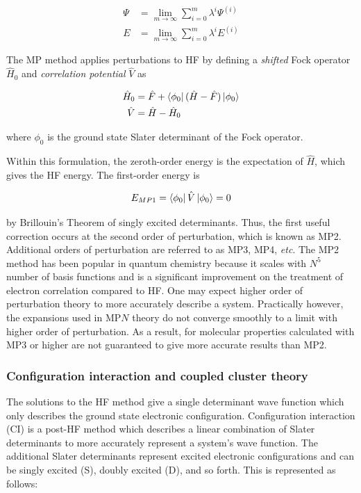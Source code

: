 \begin{align}
 \Psi &= \lim_{m\to\infty} \sum_{i=0}^{m} \lambda^i \Psi^{(i)} \\
  E &= \lim_{m\to\infty} \sum_{i=0}^{m} \lambda^i E^{(i)}
\end{align}

The MP method applies perturbations to HF by defining a \emph{shifted} Fock operator $\hat{H}_0$ and \emph{correlation potential} $\hat{V}$ as

\begin{align}
  \hat{H}_0 &= \hat{F} + \bra{\phi_0}(\hat{H}-\hat{F})\ket{\phi_0} \\
  \hat{V}   &= \hat{H} - \hat{H}_0
\end{align}

\noindent where $\phi_0$ is the ground state Slater determinant of the Fock operator.

Within this formulation, the zeroth-order energy is the expectation of $\hat{H}$, which gives the HF energy. The first-order energy is

\begin{equation}
  E_{MP1} = \bra{\phi_0}\hat{V}\ket{\phi_0} = 0
\end{equation}

\noindent by Brillouin's Theorem of singly excited determinants. Thus, the first useful correction occurs at the second order of perturbation, which is known as MP2. Additional orders of perturbation are referred to as MP3, MP4, \emph{etc}. The MP2 method has been popular in quantum chemistry because it scales with $N^5$ number of basis functions and is a significant improvement on the treatment of electron correlation compared to HF. One may expect higher order of perturbation theory to more accurately describe a system. Practically however, the expansions used in MP$N$ theory do not converge smoothly to a limit with higher order of perturbation.\cite{Leininger2000} As a result, for molecular properties calculated with MP3 or higher are not guaranteed to give more accurate results than MP2.

\subsubsection{Configuration interaction and coupled cluster theory}

The solutions to the HF method give a single determinant wave function which only describes the ground state electronic configuration. Configuration interaction (CI) is a post-HF method which describes a linear combination of Slater determinants to more accurately represent a system's wave function. The additional Slater determinants represent excited electronic configurations and can be singly excited (S), doubly excited (D), and so forth. This is represented as follows:

